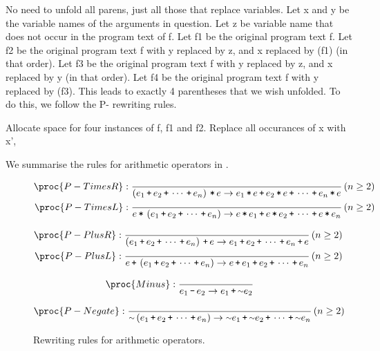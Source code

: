 No need to unfold all parens, just all those that replace variables. Let x and
y be the variable names of the arguments in question. Let z be variable name
that does not occur in the program text of f. Let f1 be the original program
text f. Let f2 be the original program text f with y replaced by z, and x
replaced by (f1) (in that order). Let f3 be the original program text f with y
replaced by z, and x replaced by y (in that order). Let f4 be the original
program text f with y replaced by (f3). This leads to exactly 4 parentheses
that we wish unfolded. To do this, we follow the P- rewriting rules.

Allocate space for
four instances of f, f1 and f2.  Replace all occurances of x with x', 

We summarise the rules for arithmetic operators in .

\begin{figure*}[htbp!]
\begin{align*}
\proc{P-TimesR}:{\over
\p{e_1 \lp e_2 \lp \cdots \lp e_n} \lt e \rightarrow e_1\lt e \lp e_2\lt e \lp
\cdots \lp e_n \lt e
}\p{n\geq 2}\\
\proc{P-TimesL}:{\over
e\lt\p{e_1 \lp e_2 \lp \cdots \lp e_n} \rightarrow e\lt e_1 \lp e\lt e_2 \lp \cdots
\lp e\lt e_n
}\p{n\geq 2}
\end{align*}

\begin{align*}
\proc{P-PlusR}:{\over
\p{e_1 \lp e_2 \lp \cdots \lp e_n} \lp e \rightarrow e_1 \lp e_2 \lp \cdots \lp e_n \lp e
}\p{n\geq 2}\\
\proc{P-PlusL}:{\over
e \lp \p{e_1 \lp e_2 \lp \cdots \lp e_n} \rightarrow e \lp e_1 \lp e_2 \lp \cdots \lp e_n
}\p{n\geq 2}
\end{align*}

\begin{align*}
\proc{Minus}:{\over
e_1 \lm e_2 \rightarrow e_1 \lp \lneg e_2
}
\end{align*}

\begin{align*}
\proc{P-Negate}:{\over
\lneg\p{e_1 \lp e_2 \lp \cdots \lp e_n} \rightarrow \lneg e_1 \lp \lneg e_2 \lp \cdots
\lp \lneg e_n
}\p{n\geq 2}
\end{align*}


\caption[]{Rewriting rules for arithmetic operators.}
\label{figure:rewriting-arithop}
\end{figure*}


